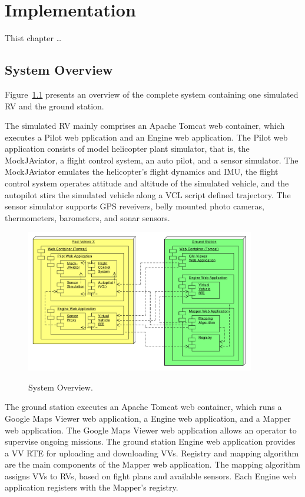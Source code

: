 
\chapter{Implementation}

Thist chapter \ldots

\section{System Overview}

Figure~\ref{fig:SystemOverview} presents an overview of the complete system containing
one simulated \ac{RV} and the ground station.

The simulated \ac{RV} mainly comprises an Apache Tomcat web container, which executes a
Pilot web pplication and an Engine web application.
%
The Pilot web application consists of model helicopter plant simulator, that is, the MockJAviator,
a flight control system, an auto pilot, and a sensor simulator.
The MockJAviator emulates the helicopter's flight dynamics and \ac{IMU},
the flight control system operates attitude and altitude of the simulated vehicle, 
and the autopilot stirs the simulated vehicle along a \ac{VCL} script defined trajectory.
The sensor simulator supports GPS reveivers, belly mounted photo cameras, thermometers, barometers, and sonar sensors. 
\begin{figure}[h]
	\begin{center}
		{\includegraphics[width=10cm]{SystemOverview.pdf}}
	\end{center}
	\caption{System Overview.\label{fig:SystemOverview}}
\end{figure}

The ground station executes an Apache Tomcat web container, which runs a Google Maps Viewer
web application, a Engine web application, and a Mapper web application.
%
The Google Maps Viewer web application allows an operator to supervise ongoing missions.
%
The ground station Engine web application provides a \ac{VV RTE} for uploading and downloading \acp{VV}. 
%
Registry and mapping algorithm are the main components of the Mapper web application.
The mapping algorithm assigns \acp{VV} to \acp{RV}, based on fight plans and available sensors.
%
Each Engine web application registers with the Mapper's registry.



